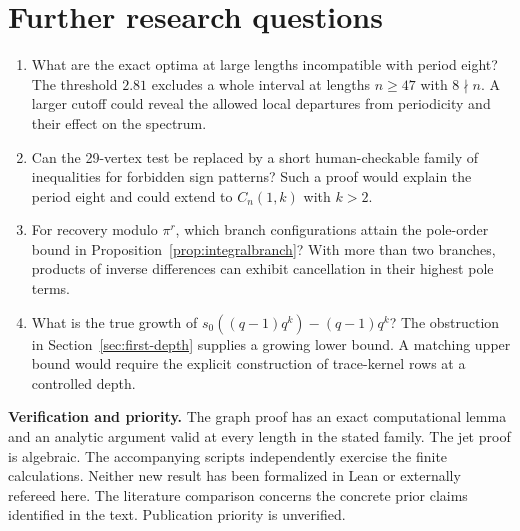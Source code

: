 \documentclass[11pt,letterpaper]{article}
\begin{document}
\section{Further research questions}
\begin{enumerate}
\item What are the exact optima at large lengths incompatible with period eight? The threshold $2.81$ excludes a whole interval at lengths $n\ge47$ with $8\nmid n$. A larger cutoff could reveal the allowed local departures from periodicity and their effect on the spectrum.
\item Can the 29-vertex test be replaced by a short human-checkable family of inequalities for forbidden sign patterns? Such a proof would explain the period eight and could extend to $C_n(1,k)$ with $k>2$.
\item For recovery modulo $\pi^r$, which branch configurations attain the pole-order bound in Proposition~\ref{prop:integralbranch}? With more than two branches, products of inverse differences can exhibit cancellation in their highest pole terms.
\item What is the true growth of $s_0((q-1)q^k)-(q-1)q^k$? The obstruction in Section~\ref{sec:first-depth} supplies a growing lower bound. A matching upper bound would require the explicit construction of trace-kernel rows at a controlled depth.
\end{enumerate}

\textbf{Verification and priority.}
The graph proof has an exact computational lemma and an analytic argument valid at every length in the stated family. The jet proof is algebraic. The accompanying scripts independently exercise the finite calculations. Neither new result has been formalized in Lean or externally refereed here. The literature comparison concerns the concrete prior claims identified in the text. Publication priority is unverified.
\end{document}
